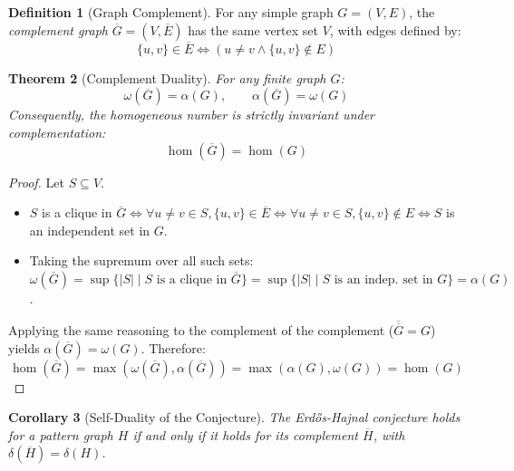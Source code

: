\documentclass[11pt,a4paper]{article}
\newtheorem{theorem}{Theorem}[section]
\newtheorem{corollary}[theorem]{Corollary}
\theoremstyle{definition}
\newtheorem{definition}[theorem]{Definition}
\begin{document}
\begin{definition}[Graph Complement]\label{def:compl}
For any simple graph $G = (V, E)$, the \emph{complement graph} $\overline{G} = (V, \overline{E})$ has the same vertex set $V$, with edges defined by:
\begin{equation}\label{eq:compl_edges}
\{u, v\} \in \overline{E} \iff (u \ne v \land \{u, v\} \notin E)
\end{equation}
\end{definition}

\begin{theorem}[Complement Duality]\label{thm:compl_dual}
For any finite graph $G$:
\begin{equation}\label{eq:dual_eq}
\omega(\overline{G}) = \alpha(G), \qquad \alpha(\overline{G}) = \omega(G)
\end{equation}
Consequently, the homogeneous number is strictly invariant under complementation:
\begin{equation}\label{eq:hom_invar}
\operatorname{hom}(\overline{G}) = \operatorname{hom}(G)
\end{equation}
\end{theorem}

\begin{proof}
Let $S \subseteq V$.
\begin{itemize}
    \item $S$ is a clique in $\overline{G} \iff \forall u \ne v \in S, \{u, v\} \in \overline{E} \iff \forall u \ne v \in S, \{u, v\} \notin E \iff S$ is an independent set in $G$.
    \item Taking the supremum over all such sets: $\omega(\overline{G}) = \sup \{ |S| \mid S \text{ is a clique in } \overline{G} \} = \sup \{ |S| \mid S \text{ is an indep. set in } G \} = \alpha(G)$.
\end{itemize}
Applying the same reasoning to the complement of the complement ($\overline{\overline{G}} = G$) yields $\alpha(\overline{G}) = \omega(G)$.
Therefore:
\[ \operatorname{hom}(\overline{G}) = \max(\omega(\overline{G}), \alpha(\overline{G})) = \max(\alpha(G), \omega(G)) = \operatorname{hom}(G) \]
\end{proof}

\begin{corollary}[Self-Duality of the Conjecture]\label{cor:self_dual}
The Erd\H{o}s-Hajnal conjecture holds for a pattern graph $H$ if and only if it holds for its complement $\overline{H}$, with $\delta(\overline{H}) = \delta(H)$.
\end{corollary}
\end{document}
